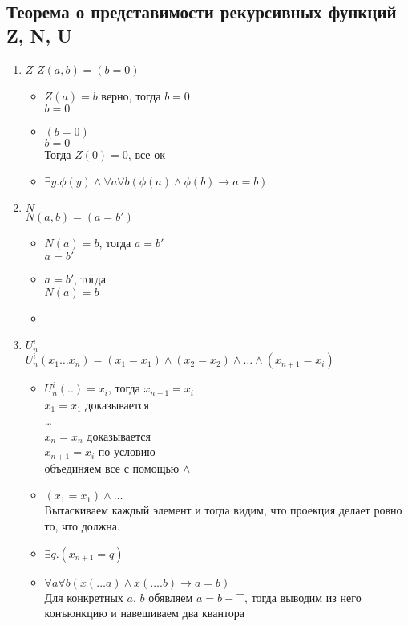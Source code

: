 \subsection{Теорема о представимости рекурсивных функций Z, N, U}
\label{sec-11-4}
\begin{enumerate}
\item $Z$
$Z(a, b) = (b = 0)$
\begin{itemize}
\item $Z(a) = b$ верно, тогда $b = 0$\\
$b = 0$
\item $(b = 0)$\\
$b = 0$\\
Тогда $Z(0) = 0$, все ок
\item $\exists y.\phi(y) \land \forall a\forall b(\phi(a) \land \phi(b) \to a = b)$\\
\end{itemize}
\item $N$\\
$N(a, b) = (a = b')$
\begin{itemize}
\item $N(a) = b$, тогда $a = b'$\\
$a = b'$
\item $a = b'$, тогда\\
$N(a) = b$
\item {}
\end{itemize}
\item $U_n^i$\\
$U_n^i(x_1 \dots x_n) = (x_1 = x_1) \land (x_2 = x_2) \land \dots  \land (x_{n+1} = x_i)$
\begin{itemize}
\item $U_n^i(..) = x_i$, тогда $x_{n+1} = x_i$\\
$x_1 = x_1$ доказывается\\
\dots\\
$x_n = x_n$ доказывается\\
$x_{n+1} = x_i$ по условию\\
объединяем все с помощью $\land$
\item $(x_1 = x_1) \land \dots$\\
Вытаскиваем каждый элемент и тогда видим, что
проекция делает ровно то, что должна.
\item $\exists q.(x_{n+1} = q)$\\
\item $\forall a\forall b(x(\dots a) \land x(\dots .b) \to a = b)$\\
Для конкретных $a$, $b$ обявляем $a = b - \top$, тогда выводим из него конъюнкцию и навешиваем два квантора
\end{itemize}
\end{enumerate}
